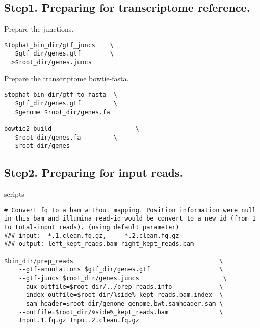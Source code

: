 \subsection{ Step1. Preparing for transcriptome reference.}
\begin{frame}[c,fragile]

	\begin{block}{ Prepare the junctions. }
		\begin{lstlisting}
$tophat_bin_dir/gtf_juncs    \
   $gtf_dir/genes.gtf        \
  >$root_dir/genes.juncs
		\end{lstlisting}
	\end{block}

	\begin{block}{ Prepare the transcriptome bowtie-fasta. }
		\begin{lstlisting}
$tophat_bin_dir/gtf_to_fasta  \
   $gtf_dir/genes.gtf         \
   $genome $root_dir/genes.fa
	
bowtie2-build 						\
   $root_dir/genes.fa         \
   $root_dir/genes
		\end{lstlisting}
	\end{block}
\end{frame}

	
	
\subsection{ Step2. Preparing for input reads.}
\begin{frame}[c,fragile]


	\begin{block}{ scripts }
		\begin{lstlisting}[basicstyle=\tiny]
# Convert fq to a bam without mapping. Position information were null in this bam and illumina read-id would be convert to a new id (from 1 to total-input reads). (using default parameter)
### input:  *.1.clean.fq.gz,     *.2.clean.fq.gz
### output: left_kept_reads.bam	right_kept_reads.bam

$bin_dir/prep_reads                                        \
    --gtf-annotations $gtf_dir/genes.gtf                   \
    --gtf-juncs $root_dir/genes.juncs 	                    \
    --aux-outfile=$root_dir/../prep_reads.info             \
    --index-outfile=$root_dir/%side%_kept_reads.bam.index  \
    --sam-header=$root_dir/genome_genome.bwt.samheader.sam \
    --outfile=$root_dir/%side%_kept_reads.bam              \
    Input.1.fq.gz Input.2.clean.fq.gz
		\end{lstlisting}
	\end{block}
\end{frame}




